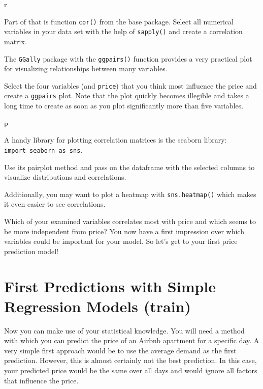 \documentclass[
  11pt,
]{book}
\begin{document}
\begin{tips}r

Part of that is function \texttt{cor()} from the base package. Select
all numerical variables in your data set with the help of
\texttt{sapply()} and create a correlation matrix.

The \texttt{GGally} package with the \texttt{ggpairs()} function
provides a very practical plot for visualizing relationships between
many variables.

Select the four variables (and \texttt{price}) that you think most
influence the price and create a \texttt{ggpairs} plot. Note that the
plot quickly becomes illegible and takes a long time to create as soon
as you plot significantly more than five variables.

\end{tips}

\begin{tipsp}p

A handy library for plotting correlation matrices is the seaborn
library: \texttt{import\ seaborn\ as\ sns}.

Use its pairplot method and pass on the dataframe with the selected
columns to visualize distributions and correlations.

Additionally, you may want to plot a heatmap with \texttt{sns.heatmap()}
which makes it even easier to see correlations.

\end{tipsp}

Which of your examined variables correlates most with price and which
seems to be more independent from price? You now have a first impression
over which variables could be important for your model. So let's get to
your first price prediction model!

\hypertarget{first-predictions-with-simple-regression-models-train}{%
\section{First Predictions with Simple Regression Models
(train)}\label{first-predictions-with-simple-regression-models-train}}

Now you can make use of your statistical knowledge. You will need a
method with which you can predict the price of an Airbnb apartment for a
specific day. A very simple first approach would be to use the average
demand as the first prediction. However, this is almost certainly not
the best prediction. In this case, your predicted price would be the
same over all days and would ignore all factors that influence the
price.
\end{document}
